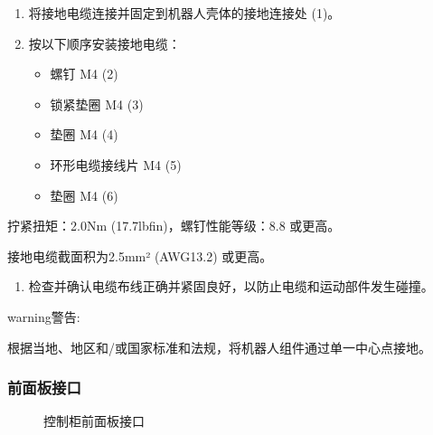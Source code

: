 \documentclass[a4paper,11pt,english,openany,oneside]{sphinxmanual}
\begin{document}
\begin{enumerate}
%
\item {} 
\sphinxAtStartPar
将接地电缆连接并固定到机器人壳体的接地连接处 (1)。

\item {} 
\sphinxAtStartPar
按以下顺序安装接地电缆：
\begin{itemize}
\item {} 
\sphinxAtStartPar
螺钉 M4 (2)

\item {} 
\sphinxAtStartPar
锁紧垫圈 M4 (3)

\item {} 
\sphinxAtStartPar
垫圈 M4 (4)

\item {} 
\sphinxAtStartPar
环形电缆接线片 M4 (5)

\item {} 
\sphinxAtStartPar
垫圈 M4 (6)

\end{itemize}

\end{enumerate}

\sphinxAtStartPar
拧紧扭矩：2.0Nm (17.7lbf\sphinxhyphen{}in)，螺钉性能等级：8.8 或更高。

\sphinxAtStartPar
接地电缆截面积为2.5mm² (AWG13.2) 或更高。
\begin{enumerate}
%
\setcounter{enumi}{2}
\item {} 
\sphinxAtStartPar
检查并确认电缆布线正确并紧固良好，以防止电缆和运动部件发生碰撞。

\end{enumerate}

\begin{sphinxadmonition}{warning}{警告:}
\sphinxAtStartPar
{}

\sphinxAtStartPar
根据当地、地区和/或国家标准和法规，将机器人组件通过单一中心点接地。 
\end{sphinxadmonition}


\subsubsection{前面板接口}
\label{\detokenize{08 _u5b89_u88c5_u4e0e_u8c03_u8bd5:id56}}\label{\detokenize{08 _u5b89_u88c5_u4e0e_u8c03_u8bd5:id57}}
\begin{figure}[H]
\centering
\capstart

\noindent{}
\caption{控制柜前面板接口}\label{\detokenize{08 _u5b89_u88c5_u4e0e_u8c03_u8bd5:id108}}\end{figure}
\end{document}
